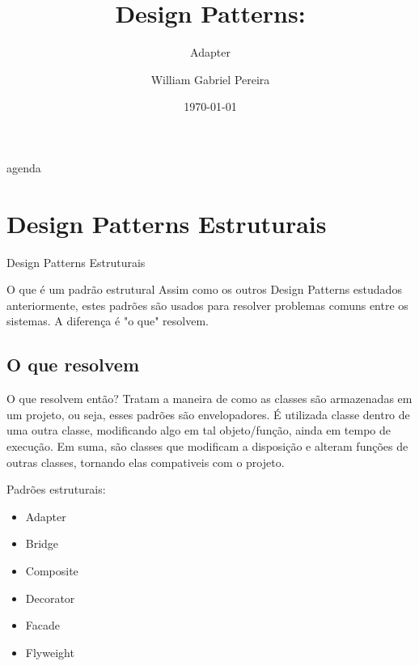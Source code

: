 \documentclass{if-beamer}
\title[Adapter]{Design Patterns:}
\subtitle{Adapter}
\author{William Gabriel Pereira}
\institute[IFC]{
  Instituto Federal Catarinense\\
  Campus Rio do Sul
}
\date{\today}
\begin{document}
\begin{frame}
	\titlepage
\end{frame}

\begin{frame}{agenda}
	\tableofcontents
\end{frame}

\section{Design Patterns Estruturais}
\begin{frame}{Design Patterns Estruturais}
	\begin{block}{O que é um padrão estrutural}
		Assim como os outros Design Patterns estudados anteriormente, estes padrões são usados para resolver problemas comuns entre os sistemas. A diferença é "o que" resolvem.	
	\end{block}
	\subsection{O que resolvem}
	\begin{block}{O que resolvem então?}
		Tratam a maneira de como as classes são armazenadas em um projeto, ou seja, esses padrões são envelopadores. É utilizada classe dentro de uma outra classe, modificando algo em tal  objeto/função, ainda em tempo de execução.
		Em suma, são classes que modificam a disposição e alteram funções de outras classes, tornando elas compativeis com o projeto.
	\end{block}
\end{frame}

\begin{frame}
	\begin{block}{Padrões estruturais:}
	\begin{itemize}
		\item Adapter
		\item Bridge
		\item Composite
		\item Decorator
		\item Facade
		\item Flyweight
	\end{itemize}
	\end{block}

\end{frame}
\end{document}

